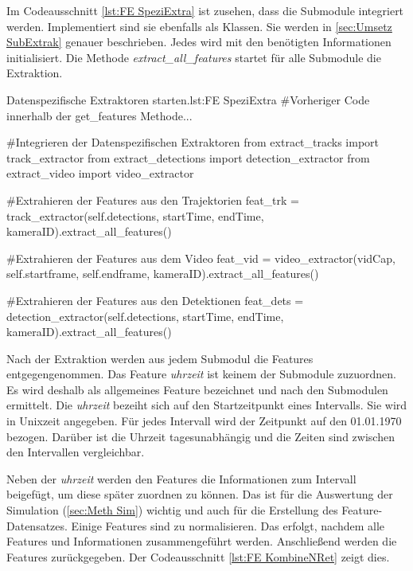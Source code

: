 Im Codeausschnitt \ref{lst:FE SpeziExtra} ist zusehen, dass die Submodule integriert werden. Implementiert sind sie ebenfalls als Klassen. Sie werden in \autoref{sec:Umsetz SubExtrak} genauer beschrieben. Jedes wird mit den benötigten Informationen initialisiert. Die Methode \textit{extract\_all\_features} startet für alle Submodule die Extraktion.

\begin{pythoncode}{Datenspezifische Extraktoren starten.}{lst:FE SpeziExtra}
#Vorheriger Code innerhalb der get_features Methode...

#Integrieren der Datenspezifischen Extraktoren
from extract_tracks import track_extractor
from extract_detections import detection_extractor
from extract_video import video_extractor

#Extrahieren der Features aus den Trajektorien
feat_trk = track_extractor(self.detections, 
                          startTime, 
                          endTime, 
                          kameraID).extract_all_features()

#Extrahieren der Features aus dem Video
feat_vid = video_extractor(vidCap, 
                           self.startframe, 
                           self.endframe, 
                           kameraID).extract_all_features()

#Extrahieren der Features aus den Detektionen
feat_dets = detection_extractor(self.detections, 
                                startTime, 
                                endTime, 
                                kameraID).extract_all_features()

\end{pythoncode}

Nach der Extraktion werden aus jedem Submodul die Features entgegengenommen. Das Feature \textit{uhrzeit} ist keinem der Submodule zuzuordnen. Es wird deshalb als allgemeines Feature bezeichnet und nach den Submodulen ermittelt. Die \textit{uhrzeit} bezeiht sich auf den Startzeitpunkt eines Intervalls. Sie wird in Unixzeit angegeben. Für jedes Intervall wird der Zeitpunkt auf den 01.01.1970 bezogen. Darüber ist die Uhrzeit tagesunabhängig und die Zeiten sind zwischen den Intervallen vergleichbar. \par

Neben der \textit{uhrzeit} werden den Features die Informationen zum Intervall beigefügt, um diese später zuordnen zu können. Das ist für die Auswertung der Simulation (\autoref{sec:Meth Sim}) wichtig und auch für die Erstellung des Feature-Datensatzes. Einige Features sind zu normalisieren. Das erfolgt, nachdem alle Features und Informationen zusammengeführt werden. Anschließend werden die Features zurückgegeben. Der Codeausschnitt \ref{lst:FE KombineNRet} zeigt dies.

